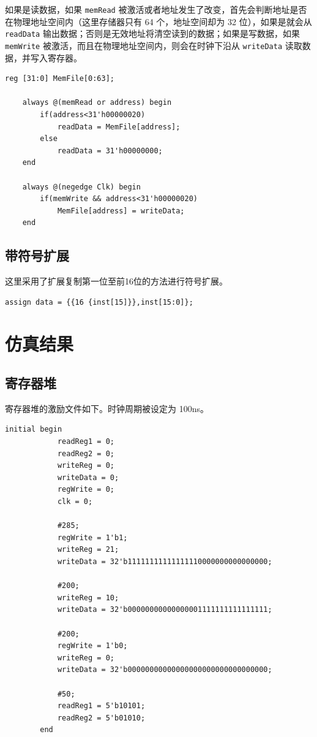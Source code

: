 \documentclass[a4paper,UTF8]{ctexart}
\begin{document}
如果是读数据，如果 \verb"memRead" 被激活或者地址发生了改变，首先会判断地址是否在物理地址空间内（这里存储器只有 64 个，地址空间却为 32 位），如果是就会从 \verb"readData" 输出数据；否则是无效地址将清空读到的数据；如果是写数据，如果 \verb"memWrite" 被激活，而且在物理地址空间内，则会在时钟下沿从 \verb"writeData" 读取数据，并写入寄存器。

\begin{lstlisting}[caption=dataMemory.v]
    reg [31:0] MemFile[0:63];

    always @(memRead or address) begin
        if(address<31'h00000020)
            readData = MemFile[address];
        else 
            readData = 31'h00000000;
    end

    always @(negedge Clk) begin
        if(memWrite && address<31'h00000020)
            MemFile[address] = writeData;
    end
\end{lstlisting}

\subsection{带符号扩展}

这里采用了扩展复制第一位至前16位的方法进行符号扩展。

\begin{lstlisting}[caption=signext.v]
    assign data = {{16 {inst[15]}},inst[15:0]};
\end{lstlisting}

\section{仿真结果}

\subsection{寄存器堆}

寄存器堆的激励文件如下。时钟周期被设定为 100ns。
    \begin{lstlisting}[caption=Registers\_tb.v,basicstyle=\ttfamily\scriptsize]
        initial begin
            readReg1 = 0;
            readReg2 = 0;
            writeReg = 0;
            writeData = 0;
            regWrite = 0;
            clk = 0;
    
            #285;
            regWrite = 1'b1;
            writeReg = 21;
            writeData = 32'b11111111111111110000000000000000;
    
            #200;
            writeReg = 10;
            writeData = 32'b00000000000000001111111111111111;
    
            #200;
            regWrite = 1'b0;
            writeReg = 0;
            writeData = 32'b00000000000000000000000000000000;
    
            #50;
            readReg1 = 5'b10101;
            readReg2 = 5'b01010;
        end
    \end{lstlisting}
\end{document}
